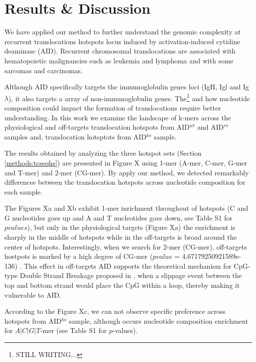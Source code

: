 \documentclass{bioinfo}
\begin{document}
\section{Results \& Discussion}

We have applied our method to further understand the genomic
complexity at recurrent translocations hotspots locus induced by
activation-induced cytidine deaminase (AID). Recurrent chromosomal
translocations are associated with hematopoietic malignancies such as
leukemia and lymphoma and with some sarcomas and
carcinomas\cite{pmid20371343}.


Although AID specifically targets the immunoglobulin genes loci (IgH,
Igl and Ig$\lambda$), it also targets a array of non-immunoglobulin
genes. The\footnote{STILL WRITING...} and how nucleotide composition could impact the formation of
translocations require better understanding. In this work we examine
the landscape of k-mers across the physiological and off-targets
translocation hotspots from AID$^{wt}$ and AID$^{rv}$ samples and,
translocation hotsptots from AID$^{ko}$ sample.


The results obtained by analyzing the three hotspot sets (Section
\ref{methods:tcseqhs}) are presented in Figure X using 1-mer (A-mer,
C-mer, G-mer and T-mer) and 2-mer (CG-mer). By apply our method, we
detected remarkably differences between the translocation hotspots
across nucleotide composition for each sample.

The Figures Xa and Xb exhibit 1-mer inrichment throughout of hotspots
(C and G nucleotides goes up and A and T nucleotides goes down, see
Table S1 for $pvalues$), but only in the physiological targets (Figure
Xa) the enrichment is sharply in the middle of hotspots while in the
off-targets is broad around the center of hotspots. Interestingly,
when we search for 2-mer (CG-mer), off-targets hostpots is marked by a
high degree of CG-mer ($pvalue$ = 4.67179250921589e-136) . This effect
in off-targets AID supports the theoretical mechanism for CpG-type
Double Strand Breakage proposed in \cite{pmid19070581}, when a
slippage event between the top and bottom strand would place the CpG
within a loop, thereby making it vulnerable to AID.

According to the Figure Xc, we can not observe specific preference
across hotspots from AID$^{ko}$ sample, although occurs nucleotide
composition enrichment for $A|C|G|T$-mer (see Table S1 for
$p$-values).
\end{document}
